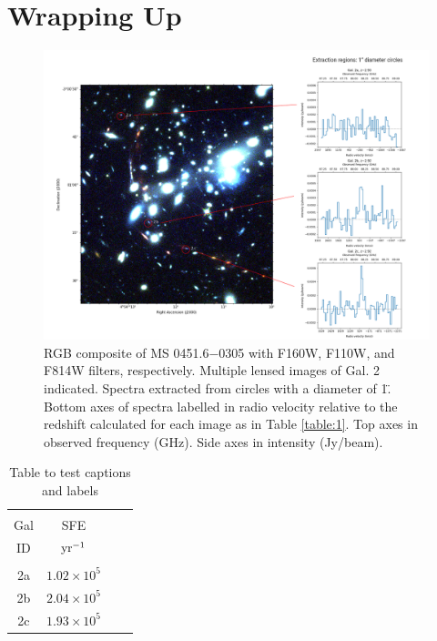 \documentclass[11pt]{article}
\begin{document}
\section*{Wrapping Up}

\begin{figure}[!htbp]
    \hspace{-1cm}
    \includegraphics[width=1.1\linewidth]{../figs/final.png}
    \caption{RGB composite of MS 0451.6−0305 with F160W, F110W, and F814W filters, respectively. Multiple lensed images of Gal. 2 indicated. Spectra extracted from circles with a diameter of 1\". Bottom axes of spectra labelled in radio velocity relative to the redshift calculated for each image as in Table \ref{table:1}. Top axes in observed frequency (GHz). Side axes in intensity (Jy/beam).}
    \label{fig:final_oteo}
\end{figure}

\begin{table}[!htbp]
\centering
\begin{tabular}{cccc}
\hline \\[-0.25cm]
Gal & SFE \\
ID  & $\rm{yr^{-1}}$ \\[0.1cm]
\hline \\[-0.25cm]
2a & $1.02\times 10^{5}$ \\
2b & $2.04\times 10^{5}$ \\
2c & $1.93\times 10^{5}$ \\
\hline
\end{tabular}
\caption{Table to test captions and labels}
\label{table:4}
\end{table}

\nocite{*}

\end{document}
